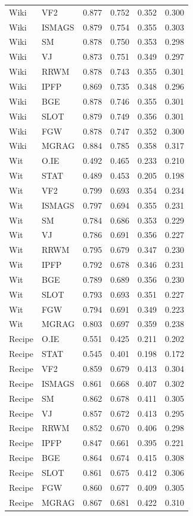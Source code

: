 {\begin{longtable}{llrrrr}
Wiki & VF2 & 0.877 & 0.752 & 0.352 & 0.300 \\
Wiki & ISMAGS & 0.879 & 0.754 & 0.355 & 0.303 \\
Wiki & SM & 0.878 & 0.750 & 0.353 & 0.298 \\
Wiki & VJ & 0.873 & 0.751 & 0.349 & 0.297 \\
Wiki & RRWM & 0.878 & 0.743 & 0.355 & 0.301 \\
Wiki & IPFP & 0.869 & 0.735 & 0.348 & 0.296 \\
Wiki & BGE & 0.878 & 0.746 & 0.355 & 0.301 \\
Wiki & SLOT & 0.879 & 0.749 & 0.356 & 0.301 \\
Wiki & FGW & 0.878 & 0.747 & 0.352 & 0.300 \\
Wiki & MGRAG & 0.884 & 0.785 & 0.358 & 0.317 \\
\midrule
Wit & O.IE & 0.492 & 0.465 & 0.233 & 0.210 \\
Wit & STAT & 0.489 & 0.453 & 0.205 & 0.198 \\
Wit & VF2 & 0.799 & 0.693 & 0.354 & 0.234 \\
Wit & ISMAGS & 0.797 & 0.694 & 0.355 & 0.231 \\
Wit & SM & 0.784 & 0.686 & 0.353 & 0.229 \\
Wit & VJ & 0.786 & 0.691 & 0.356 & 0.227 \\
Wit & RRWM & 0.795 & 0.679 & 0.347 & 0.230 \\
Wit & IPFP & 0.792 & 0.678 & 0.346 & 0.231 \\
Wit & BGE & 0.789 & 0.689 & 0.356 & 0.230 \\
Wit & SLOT & 0.793 & 0.693 & 0.351 & 0.227 \\
Wit & FGW & 0.794 & 0.691 & 0.349 & 0.223 \\
Wit & MGRAG & 0.803 & 0.697 & 0.359 & 0.238 \\
\midrule
Recipe & O.IE & 0.551 & 0.425 & 0.211 & 0.202 \\
Recipe & STAT & 0.545 & 0.401 & 0.198 & 0.172 \\
Recipe & VF2 & 0.859 & 0.679 & 0.413 & 0.304 \\
Recipe & ISMAGS & 0.861 & 0.668 & 0.407 & 0.302 \\
Recipe & SM & 0.862 & 0.678 & 0.411 & 0.305 \\
Recipe & VJ & 0.857 & 0.672 & 0.413 & 0.295 \\
Recipe & RRWM & 0.852 & 0.670 & 0.406 & 0.298 \\
Recipe & IPFP & 0.847 & 0.661 & 0.395 & 0.221 \\
Recipe & BGE & 0.864 & 0.674 & 0.415 & 0.308 \\
Recipe & SLOT & 0.861 & 0.675 & 0.412 & 0.306 \\
Recipe & FGW & 0.860 & 0.677 & 0.409 & 0.305 \\
Recipe & MGRAG & 0.867 & 0.681 & 0.422 & 0.310 \\
\midrule
\end{longtable}
}
